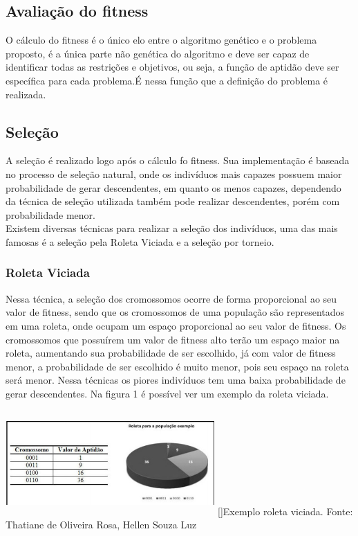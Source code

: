 \documentclass[a4paper,11pt]{article}
\newenvironment{Figure}
  {\par\medskip\noindent\minipage{\linewidth}}
    {\endminipage\par\medskip}
\begin{document}
\begin{multicols}{2}
\subsection{Avaliação do fitness}
O cálculo do fitness é o único elo entre o algoritmo genético e o problema proposto, é a única parte não genética do algoritmo e deve ser capaz de identificar todas as restrições e objetivos, ou seja, a função de aptidão deve ser específica para cada problema.É nessa função que a definição do problema é realizada.
 
\subsection{Seleção}
A seleção é realizado logo após o cálculo fo fitness. Sua implementação é baseada no processo de seleção natural, onde os indivíduos mais capazes possuem maior probabilidade de gerar descendentes, em quanto os menos capazes, dependendo da técnica de seleção utilizada também pode realizar descendentes, porém com probabilidade menor.\\
Existem diversas técnicas para realizar a seleção dos indivíduos, uma das mais famosas é a seleção pela Roleta Viciada e a seleção por torneio.

\subsubsection{Roleta Viciada}
Nessa técnica, a seleção dos cromossomos ocorre de forma proporcional ao seu valor de fitness, sendo que os cromossomos de uma população são representados em uma roleta, onde ocupam um espaço proporcional ao seu valor de fitness. Os cromossomos que possuírem um valor de fitness alto terão um espaço maior na roleta, aumentando sua probabilidade de ser escolhido, já com valor de fitness menor, a probabilidade de ser escolhido é muito menor, pois seu espaço na roleta será menor. Nessa técnicas os piores indivíduos tem uma baixa probabilidade de gerar descendentes. Na figura 1 é possível ver um exemplo da roleta viciada.

\begin{Figure}
	\centering 
	\includegraphics[width=8cm, height=4cm]{figura1}
	[]{Exemplo roleta viciada. Fonte: Thatiane de Oliveira Rosa, Hellen Souza Luz}
	\label{medium}
\end{Figure}


\end{multicols}
\end{document}
